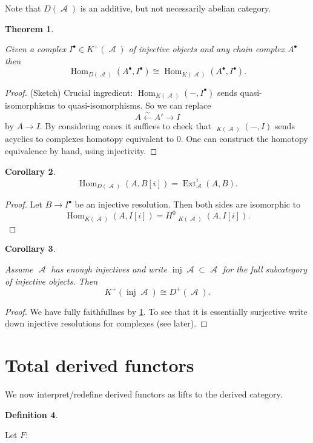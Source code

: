 \documentclass[10pt,]{book}
\theoremstyle{plain}
\newtheorem{theorem}{Theorem}[section]
\newtheorem{corollary}[theorem]{Corollary}
\theoremstyle{definition}
\newtheorem{definition}[theorem]{Definition}
\numberwithin{equation}{section}
\DeclareMathOperator{\Hom}{Hom}
\DeclareMathOperator{\cHom}{\underline{Hom}}
\DeclareMathOperator{\Ext}{Ext}
\DeclareMathOperator{\inj}{inj}
\DeclareMathOperator{\cA}{\mathcal{A}}
\begin{document}
          Note that \(D(\cA)\) is an additive, but not necessarily abelian category.
\begin{theorem}\label{thm-inj-der-hom}

            Given a complex \(I^\bullet \in K^+(\cA)\) of injective objects and any chain complex \(A^\bullet\) then \[\Hom_{D(\cA)}(A^\bullet , I^\bullet) \cong \Hom_{K(\cA)}(A^\bullet, I^\bullet).\]\end{theorem}
\begin{proof}

            (Sketch) Crucial ingredient: \(\Hom_{K(\cA)}(-, I ^\bullet)\) sends quasi-isomorphisms to quasi-isomorphisms.
            So we can replace 
            \[
              A \xleftarrow{\sim} A' \xrightarrow{} I
            \]
            by \(A \to I\).
            By considering cones it suffices to check that \(\cHom_{K(\cA)}(-, I)\) sends acyclics to complexes homotopy equivalent to \(0\).
            One can construct the homotopy equivalence by hand, using injectivity.
          \end{proof}
\begin{corollary}\label{corollary-5}
\[
              \Hom_{D(\cA)}(A,B[i]) = \Ext^i_{\cA}(A,B).
            \]\end{corollary}
\begin{proof}

            Let \(B \to I^\bullet\) be an injective resolution.
            Then both sides are isomorphic to 
            \[
              \Hom_{K(\cA)}(A,I[i]) = H^0 \cHom_{K(\cA)}(A, I[i]).
            \]\end{proof}
\begin{corollary}\label{corollary-6}

            Assume \(\cA\) has enough injectives and write \(\inj \cA \subset \cA\) for the full subcategory of injective objects.
            Then
            \[
              K^+(\inj \cA) \cong D^+(\cA).
            \]\end{corollary}
\begin{proof}

            We have fully faithfullnes by \ref{thm-inj-der-hom}.
            To see that it is essentially surjective write down injective resolutions for complexes (see later).
          \end{proof}
\typeout{************************************************}
\typeout{************************************************}
\section[Total derived functors]{Total derived functors}\label{sec-total-derived}
We now interpret/redefine derived functors as lifts to the derived category.%
\begin{definition}\label{definition-24}

            Let \(F\colon\)\end{definition}
\typeout{************************************************}
\typeout{************************************************}
\end{document}
